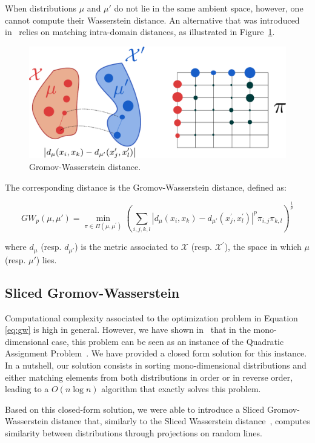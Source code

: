 When distributions $\mu$ and $\mu'$ do not lie in the same ambient space,
however, one cannot compute their Wasserstein distance. An alternative that was
introduced in~\cite{memoli2011gromov} relies on matching intra-domain
distances, as illustrated in Figure~\ref{fig:gw}.

\begin{figure}
\centering
\includegraphics[width=.6\textwidth]{fig/gw}
\caption{Gromov-Wasserstein distance. \label{fig:gw}}
\end{figure}

The corresponding distance is the Gromov-Wasserstein distance, defined as:

\begin{equation}
    GW_p(\mu, \mu') = \min_{\pi \in \Pi(\mu, \mu^\prime)}
        \left(
            \sum_{i,j,k,l}
            \left| d_\mu(x_i, x_k) - d_{\mu'}(x^\prime_j, x^\prime_l) \right|^p
            \pi_{i,j} \pi_{k,l}
        \right)^{\frac{1}{p}}
    \label{eq:gw}
\end{equation}

where $d_\mu$ (resp. $d_{\mu'}$) is the metric associated to $\mathcal{X}$
(resp. $\mathcal{X}^\prime$), the space in which $\mu$ (resp. $\mu'$) lies.

\subsection{Sliced Gromov-Wasserstein}

Computational complexity associated to the optimization problem in
Equation \eqref{eq:gw} is high in general.
However, we have shown in~\cite{vayer:hal-02174309} that in the
mono-dimensional case, this problem can be seen as an instance of the Quadratic
Assignment Problem~\cite{koopmans1957assignment}.
We have provided a closed form solution for this instance.
In a nutshell, our solution consists in sorting mono-dimensional distributions
and either matching elements from both distributions in order or in reverse
order, leading to a $O(n \log n)$ algorithm that exactly solves this problem.

Based on this closed-form solution, we were able to introduce a Sliced
Gromov-Wasserstein distance that, similarly to the Sliced Wasserstein
distance~\cite{rabin2011wasserstein}, computes similarity between distributions
through projections on random lines.


